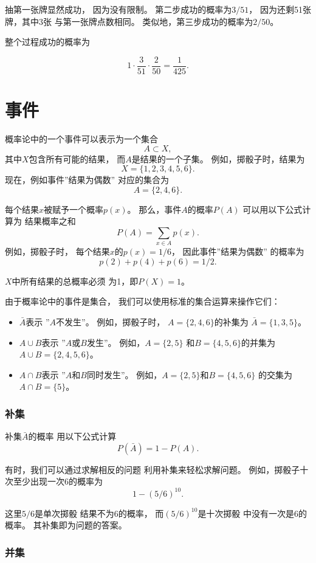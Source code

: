 抽第一张牌显然成功，
因为没有限制。
第二步成功的概率为$3/51$，
因为还剩51张牌，其中3张
与第一张牌点数相同。
类似地，第三步成功的概率为$2/50$。

整个过程成功的概率为

\[1 \cdot \frac{3}{51} \cdot \frac{2}{50} = \frac{1}{425}.\]

\section{事件}

概率论中的一个事件可以表示为一个集合
\[A \subset X,\]
其中$X$包含所有可能的结果，
而$A$是结果的一个子集。
例如，掷骰子时，结果为
\[X = \{1,2,3,4,5,6\}.\]
现在，例如事件''结果为偶数''
对应的集合为
\[A = \{2,4,6\}.\]

每个结果$x$被赋予一个概率$p(x)$。
那么，事件$A$的概率$P(A)$
可以用以下公式计算为
结果概率之和
\[P(A) = \sum_{x \in A} p(x).\]
例如，掷骰子时，
每个结果$x$的$p(x)=1/6$，
因此事件''结果为偶数''
的概率为
\[p(2)+p(4)+p(6)=1/2.\]

$X$中所有结果的总概率必须
为1，即$P(X)=1$。

由于概率论中的事件是集合，
我们可以使用标准的集合运算来操作它们：

\begin{itemize}
\item {}$\bar A$表示
''$A$不发生''。
例如，掷骰子时，
$A=\{2,4,6\}$的补集为
$\bar A = \{1,3,5\}$。
\item {}$A \cup B$表示
''$A$或$B$发生''。
例如，$A=\{2,5\}$
和$B=\{4,5,6\}$的并集为
$A \cup B = \{2,4,5,6\}$。
\item {}$A \cap B$表示
''$A$和$B$同时发生''。
例如，$A=\{2,5\}$和$B=\{4,5,6\}$
的交集为
$A \cap B = \{5\}$。
\end{itemize}

\subsubsection{补集}

补集$\bar A$的概率
用以下公式计算
\[P(\bar A)=1-P(A).\]

有时，我们可以通过求解相反的问题
利用补集来轻松求解问题。
例如，掷骰子十次至少出现一次6的概率为
\[1-(5/6)^{10}.\]

这里$5/6$是单次掷骰
结果不为6的概率，
而$(5/6)^{10}$是十次掷骰
中没有一次是6的概率。
其补集即为问题的答案。

\subsubsection{并集}

